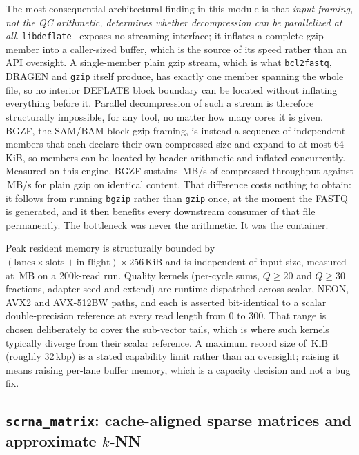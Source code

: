 \documentclass[10pt,twocolumn]{article}
\begin{document}
The most consequential architectural finding in this module is that
\emph{input framing, not the QC arithmetic, determines whether decompression
can be parallelized at all}. \texttt{libdeflate}~\citep{biggers2016libdeflate}
exposes no streaming interface; it inflates a complete gzip member into a
caller-sized buffer, which is the source of its speed rather than an API
oversight. A single-member plain gzip stream, which is what
\texttt{bcl2fastq}, DRAGEN and \texttt{gzip} itself produce, has exactly one
member spanning the whole file, so no interior DEFLATE block boundary can be
located without inflating everything before it. Parallel decompression of
such a stream is therefore structurally impossible, for any tool, no matter
how many cores it is given. BGZF, the SAM/BAM block-gzip framing, is instead
a sequence of independent members that each declare their own compressed size
and expand to at most 64\,KiB, so members can be located by header arithmetic
and inflated concurrently. Measured on this engine, BGZF sustains
\FqBgzfThroughput{}\,MB/s of compressed throughput against
\FqGzipThroughput{}\,MB/s for plain gzip on identical content. That
\FqFramingSpeedup{} difference costs nothing to obtain: it follows from
running \texttt{bgzip} rather than \texttt{gzip} once, at the moment the
FASTQ is generated, and it then benefits every downstream consumer of that
file permanently. The bottleneck was never the arithmetic. It was the
container.

Peak resident memory is structurally bounded by
$(\text{lanes} \times \text{slots} + \text{in-flight}) \times 256\,\text{KiB}$
and is independent of input size, measured at \FqPeakRss{}\,MB on a 200k-read
run. Quality kernels (per-cycle sums, $Q{\geq}20$ and $Q{\geq}30$ fractions,
adapter seed-and-extend) are runtime-dispatched across scalar, NEON, AVX2 and
AVX-512BW paths, and each is asserted bit-identical to a scalar
double-precision reference at every read length from 0 to 300. That range is
chosen deliberately to cover the sub-vector tails, which is where such
kernels typically diverge from their scalar reference. A maximum record size
of \FqRecordLimit{}\,KiB (roughly 32\,kbp) is a stated capability limit
rather than an oversight; raising it means raising per-lane buffer memory,
which is a capacity decision and not a bug fix.

\subsection{\texttt{scrna\_matrix}: cache-aligned sparse matrices and
approximate \texorpdfstring{$k$}{k}-NN}
\label{sec:scrna}
\end{document}
